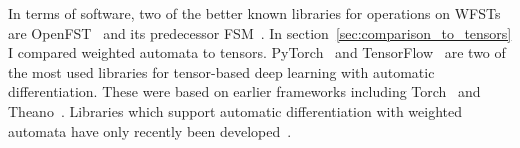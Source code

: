 \documentclass[main.tex]{subfiles}
\begin{document}
In terms of software, two of the better known libraries for operations on WFSTs
are OpenFST~\citep{mohri2000design} and its predecessor
FSM~\citep{allauzen2007openfst}. In section~\ref{sec:comparison_to_tensors} I
compared weighted automata to tensors. PyTorch~\citep{paszke2019pytorch} and
TensorFlow~\citep{abadi2016tensorflow} are two of the most used libraries for
tensor-based deep learning with automatic differentiation. These were based on
earlier frameworks including Torch~\citep{collobert2011torch7} and
Theano~\citep{bergstra2010theano}. Libraries which support automatic
differentiation with weighted automata have only recently been
developed~\citep{k2, hannun2020differentiable}.
\end{document}

